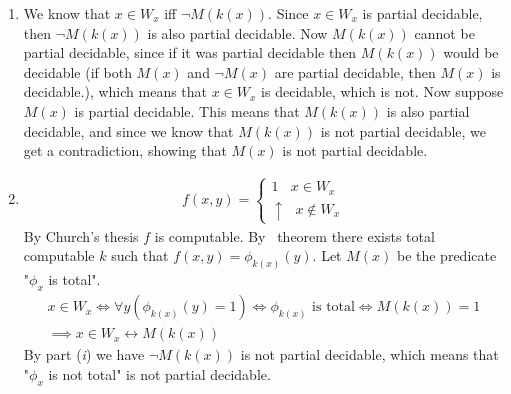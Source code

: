 \begin{enumerate}[label=\ilabel]
    \item 
        We know that $x \in W_x$ iff $\neg M(k(x))$. Since $x \in W_x$ is partial decidable, then $\neg M(k(x))$ is also partial decidable. Now $M(k(x))$ cannot be partial decidable, since if it was partial decidable then $M(k(x))$ would be decidable (if both $M(x)$ and $\neg M(x)$ are partial decidable, then $M(x)$ is decidable.), which means that $x \in W_x$ is decidable, which is not. Now suppose $M(x)$ is partial decidable. This means that $M(k(x))$ is also partial decidable, and since we know that $M(k(x))$ is not partial decidable, we get a contradiction, showing that $M(x)$ is not partial decidable.

    \item 
        \begin{gather*}
            f(x, y) = \begin{cases}
                1 \ \ \ \ x \in W_x \\
                \uparrow \ \ \ x \notin W_x
            \end{cases}
        \end{gather*}
        By Church's thesis $f$ is computable. By \smn\ theorem there exists total computable $k$ such that $f(x, y) = \phi_{k(x)}(y)$. Let $M(x)$ be the predicate "$\phi_x$ is total". 
        \begin{gather*}
            x \in W_x \iff \forall y(\phi_{k(x)}(y) = 1) \iff \phi_{k(x)} \text{ is total} \iff M(k(x)) = 1 \\
            \implies x \in W_x \longleftrightarrow  M(k(x))
        \end{gather*}
        By part (\textit{i}) we have $\neg M(k(x))$ is not partial decidable, which means that "$\phi_x$ is not total" is not partial decidable.


\end{enumerate}
